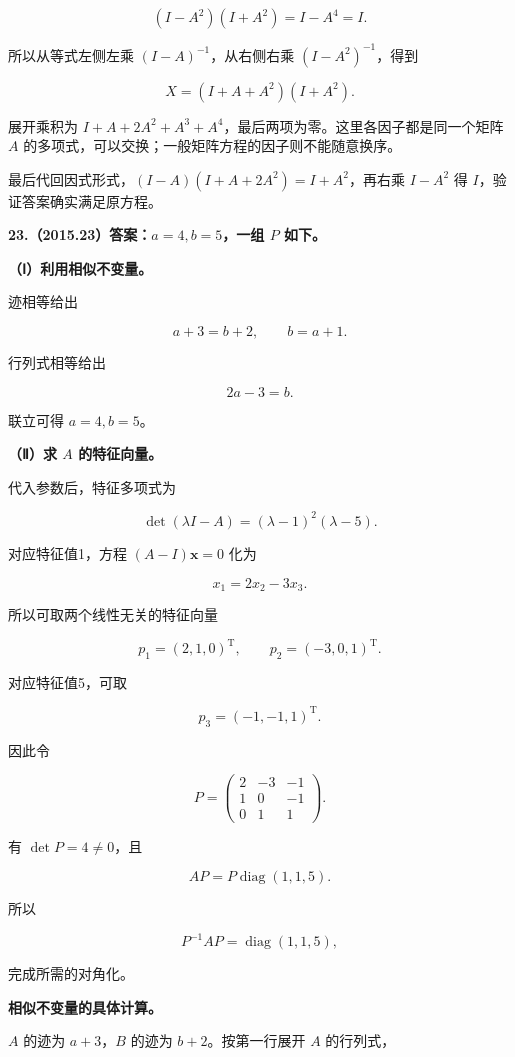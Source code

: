 \documentclass[UTF8,11pt,fontset=windows]{ctexart}
\begin{document}
$$
(I-A^2)(I+A^2)=I-A^4=I.
$$

所以从等式左侧左乘 $(I-A)^{-1}$，从右侧右乘 $(I-A^2)^{-1}$，得到

$$
X=(I+A+A^2)(I+A^2).
$$

展开乘积为 $I+A+2A^2+A^3+A^4$，最后两项为零。这里各因子都是同一个矩阵 $A$ 的多项式，可以交换；一般矩阵方程的因子则不能随意换序。

最后代回因式形式，$ (I-A)(I+A+2A^2)=I+A^2$，再右乘 $I-A^2$ 得 $I$，验证答案确实满足原方程。

\clearpage

\textbf{23.（2015.23）答案：$a=4,b=5$，一组 $P$ 如下。}

\textbf{（Ⅰ）利用相似不变量。}

迹相等给出

$$
a+3=b+2,
\qquad b=a+1.
$$

行列式相等给出

$$
2a-3=b.
$$

联立可得 $a=4,b=5$。

\textbf{（Ⅱ）求 $A$ 的特征向量。}

代入参数后，特征多项式为

$$
\det(\lambda I-A)=(\lambda-1)^2(\lambda-5).
$$

对应特征值1，方程 $(A-I)\boldsymbol x=0$ 化为

$$
x_1=2x_2-3x_3.
$$

所以可取两个线性无关的特征向量

$$
p_1=(2,1,0)^{\mathrm T},\qquad p_2=(-3,0,1)^{\mathrm T}.
$$

对应特征值5，可取

$$
p_3=(-1,-1,1)^{\mathrm T}.
$$

因此令

$$
P=\begin{pmatrix}2&-3&-1\\1&0&-1\\0&1&1\end{pmatrix}.
$$

有 $\det P=4\ne0$，且

$$
AP=P\operatorname{diag}(1,1,5).
$$

所以

$$
P^{-1}AP=\operatorname{diag}(1,1,5),
$$

完成所需的对角化。

\textbf{相似不变量的具体计算。}

$A$ 的迹为 $a+3$，$B$ 的迹为 $b+2$。按第一行展开 $A$ 的行列式，
\end{document}
